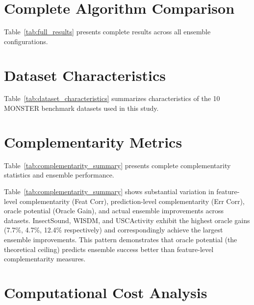 \documentclass[pdflatex,sn-basic]{sn-jnl}           %
\theoremstyle{thmstyleone}%
\theoremstyle{thmstyletwo}%
\theoremstyle{thmstylethree}%
\begin{document}
\backmatter

\clearpage

\begin{appendices}

\section{Complete Algorithm Comparison}\label{appA}

Table~\ref{tab:full_results} presents complete results across all ensemble configurations.



\clearpage

\section{Dataset Characteristics}\label{appB}

Table~\ref{tab:dataset_characteristics} summarizes characteristics of the 10 MONSTER benchmark datasets used in this study.



\clearpage

\section{Complementarity Metrics}\label{appC}

Table~\ref{tab:complementarity_summary} presents complete complementarity statistics and ensemble performance.



Table~\ref{tab:complementarity_summary} shows substantial variation in feature-level complementarity (Feat Corr), prediction-level complementarity (Err Corr), oracle potential (Oracle Gain), and actual ensemble improvements across datasets. InsectSound, WISDM, and USCActivity exhibit the highest oracle gains (7.7\%, 4.7\%, 12.4\% respectively) and correspondingly achieve the largest ensemble improvements. This pattern demonstrates that oracle potential (the theoretical ceiling) predicts ensemble success better than feature-level complementarity measures.

\clearpage

\section{Computational Cost Analysis}\label{appD}


\end{appendices}
\end{document}
